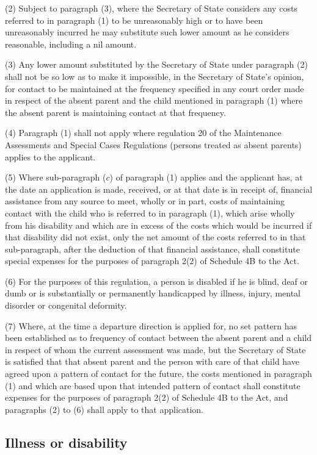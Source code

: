\documentclass[a4paper]{article}
\begin{document}
(2) Subject to paragraph (3), where the Secretary of State considers any costs
referred to in paragraph (1) to be unreasonably high or to have been
unreasonably incurred he may substitute such lower amount as he considers
reasonable, including a nil amount.

(3) Any lower amount substituted by the Secretary of State under paragraph (2)
shall not be so low as to make it impossible, in the Secretary of State’s
opinion, for contact to be maintained at the frequency specified in any court
order made in respect of the absent parent and the child mentioned in paragraph
(1) where the absent parent is maintaining contact at that frequency.

(4) Paragraph (1) shall not apply where regulation 20 of the Maintenance
Assessments and Special Cases Regulations (persons treated as absent parents)
applies to the applicant.

(5) Where sub-paragraph ($c$) of paragraph (1) applies and the applicant has, at
the date an application is made, received, or at that date is in receipt of,
financial assistance from any source to meet, wholly or in part, costs of
maintaining contact with the child who is referred to in paragraph (1), which
arise wholly from his disability and which are in excess of the costs which
would be incurred if that disability did not exist, only the net amount of the
costs referred to in that sub-paragraph, after the deduction of that financial
assistance, shall constitute special expenses for the purposes of paragraph 2(2)
of Schedule 4B to the Act.

(6) For the purposes of this regulation, a person is disabled if he is blind,
deaf or dumb or is substantially or permanently handicapped by illness, injury,
mental disorder or congenital deformity.

(7) Where, at the time a departure direction is applied for, no set pattern has
been established as to frequency of contact between the absent parent and a
child in respect of whom the current assessment was made, but the Secretary of
State is satisfied that that absent parent and the person with care of that
child have agreed upon a pattern of contact for the future, the costs mentioned
in paragraph (1) and which are based upon that intended pattern of contact shall
constitute expenses for the purposes of paragraph 2(2) of Schedule 4B to the
Act, and paragraphs (2) to (6) shall apply to that application.

\subsection[15. Illness or disability]{Illness or disability}
\end{document}

